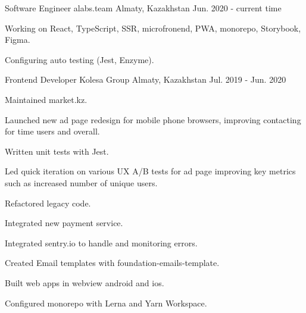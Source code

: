 

\begin{cventries}

  \cventry
    {Software Engineer} %
    {alabs.team} %
    {Almaty, Kazakhstan} %
    {Jun. 2020 - current time} %
    {
      \begin{cvitems} %
        \item {Working on React, TypeScript, SSR, microfronend, PWA, monorepo, Storybook, Figma.}
        \item {Configuring auto testing (Jest, Enzyme).}
      \end{cvitems}
    }

  \cventry
    {Frontend Developer} %
    {Kolesa Group} %
    {Almaty, Kazakhstan} %
    {Jul. 2019 - Jun. 2020} %
    {
      \begin{cvitems} %
        \item {Maintained market.kz.}
        \item {Launched new ad page redesign for mobile phone browsers, improving contacting for time users and overall.}
        \item {Written unit tests with Jest.}
        \item {Led quick iteration on various UX A/B tests for ad page improving key metrics such as increased number of unique users.}
        \item {Refactored legacy code.}
        \item {Integrated new payment service.}
        \item {Integrated sentry.io to handle and monitoring errors.}
        \item {Created Email templates with foundation-emails-template.}
        \item {Built web apps in webview android and ios.}
        \item {Configured monorepo with Lerna and Yarn Workspace.}
      \end{cvitems}
    }


\end{cventries}

